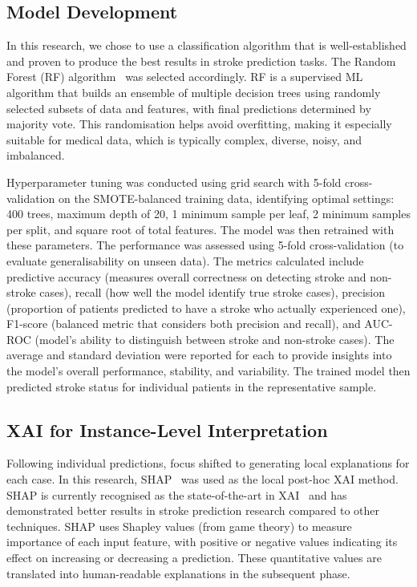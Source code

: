 \subsection{Model Development}
In this research, we chose to use a classification algorithm that is well-established and proven to produce the best results in stroke prediction tasks. The Random Forest (RF) algorithm~\cite{breiman2001random} was selected accordingly. RF is a supervised ML algorithm that builds an ensemble of multiple decision trees using randomly selected subsets of data and features, with final predictions determined by majority vote. This randomisation helps avoid overfitting, making it especially suitable for medical data, which is typically complex, diverse, noisy, and imbalanced.

\medskip
Hyperparameter tuning was conducted using grid search with 5-fold cross-validation on the SMOTE-balanced training data, identifying optimal settings: 400 trees, maximum depth of 20, 1 minimum sample per leaf, 2 minimum samples per split, and square root of total features. The model was then retrained with these parameters. The performance was assessed using 5-fold cross-validation (to evaluate generalisability on unseen data). The metrics calculated include predictive accuracy (measures overall correctness on detecting stroke and non-stroke cases), recall (how well the model identify true stroke cases), precision (proportion of patients predicted to have a stroke who actually experienced one), F1-score (balanced metric that considers both precision and recall), and AUC-ROC (model's ability to distinguish between stroke and non-stroke cases). The average and standard deviation were reported for each to provide insights into the model's overall performance, stability, and variability. The trained model then predicted stroke status for individual patients in the representative sample.

\subsection{XAI for Instance-Level Interpretation}
Following individual predictions, focus shifted to generating local explanations for each case. In this research, SHAP~\cite{lundberg2017unified} was used as the local post-hoc XAI method. SHAP is currently recognised as the state-of-the-art in XAI~\cite{l6} and has demonstrated better results in stroke prediction research compared to other techniques. SHAP uses Shapley values (from game theory) to measure importance of each input feature, with positive or negative values indicating its effect on increasing or decreasing a prediction. These quantitative values are translated into human-readable explanations in the subsequent phase.

